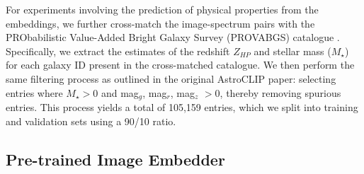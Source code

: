 \documentclass[a4paper,12pt]{article}
\begin{document}
For experiments involving the prediction of physical properties from the embeddings, we further cross-match the image-spectrum pairs with the PRObabilistic Value-Added Bright Galaxy Survey (PROVABGS) catalogue \cite{PROVABGS}. Specifically, we extract the estimates of the redshift $Z_{HP}$ and stellar mass ($M_{\star}$) for each galaxy ID present in the cross-matched catalogue. We then perform the same filtering process as outlined in the original AstroCLIP paper: selecting entries where $M_{\star} > 0$ and mag$_g$, mag$_r$, mag$_z$ $> 0$, thereby removing spurious entries. This process yields a total of 105,159 entries, which we split into training and validation sets using a 90/10 ratio.


\subsection{Pre-trained Image Embedder} 
\label{sec:resnet}
\end{document}
